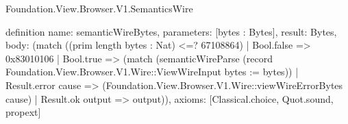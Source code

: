 \begin{lexlean}{Foundation.View.Browser.V1.SemanticsWire}
\begin{semanticmodule}
definition{
  name: semanticWireBytes,
  parameters: [bytes : Bytes],
  result: Bytes,
  body: (match ((prim length bytes : Nat) <=? 67108864)
    | Bool.false => 0x83010106
    | Bool.true => (match (semanticWireParse (record Foundation.View.Browser.V1.Wire::ViewWireInput {bytes := bytes}))
      | Result.error cause => (Foundation.View.Browser.V1.Wire::viewWireErrorBytes cause)
      | Result.ok output => output)),
  axioms: [Classical.choice, Quot.sound, propext]
}
\end{semanticmodule}
\end{lexlean}
